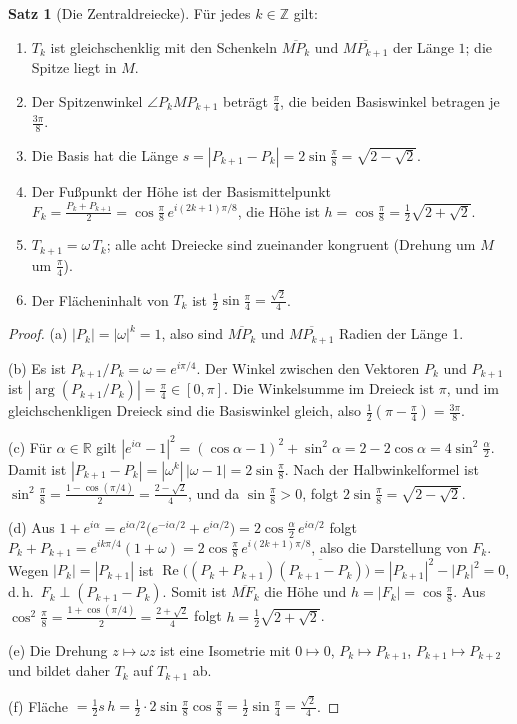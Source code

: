 \documentclass[a4paper,12pt,twoside]{report}
\theoremstyle{definition}
\newtheorem{satz}{Satz}
\begin{document}
\begin{satz}[Die Zentraldreiecke]\label{ok:satz:dreieck}
Für jedes $k\in\mathbb{Z}$ gilt:
\begin{enumerate}[label=(\alph*)]
\item $T_k$ ist gleichschenklig mit den Schenkeln $\overline{MP_k}$ und $\overline{MP_{k+1}}$ der Länge $1$; die Spitze liegt in $M$.
\item Der Spitzenwinkel $\angle P_kMP_{k+1}$ beträgt $\frac\pi4$, die beiden Basiswinkel betragen je $\frac{3\pi}{8}$.
\item Die Basis hat die Länge $s=|P_{k+1}-P_k|=2\sin\frac\pi8=\sqrt{2-\sqrt2}$.
\item Der Fußpunkt der Höhe ist der Basismittelpunkt $F_k=\frac{P_k+P_{k+1}}2=\cos\frac\pi8\,e^{i(2k+1)\pi/8}$, die Höhe ist $h=\cos\frac\pi8=\frac12\sqrt{2+\sqrt2}$.
\item $T_{k+1}=\omega\,T_k$; alle acht Dreiecke sind zueinander kongruent (Drehung um $M$ um $\frac\pi4$).
\item Der Flächeninhalt von $T_k$ ist $\frac12\sin\frac\pi4=\frac{\sqrt2}{4}$.
\end{enumerate}
\end{satz}

\begin{proof}
(a) $|P_k|=|\omega|^k=1$, also sind $\overline{MP_k}$ und $\overline{MP_{k+1}}$ Radien der Länge 1.

(b) Es ist $P_{k+1}/P_k=\omega=e^{i\pi/4}$. Der Winkel zwischen den Vektoren $P_k$ und $P_{k+1}$ ist $|\arg(P_{k+1}/P_k)|=\frac\pi4\in[0,\pi]$. Die Winkelsumme im Dreieck ist $\pi$, und im gleichschenkligen Dreieck sind die Basiswinkel gleich, also $\frac12(\pi-\frac\pi4)=\frac{3\pi}8$.

(c) Für $\alpha\in\mathbb{R}$ gilt $|e^{i\alpha}-1|^2=(\cos\alpha-1)^2+\sin^2\alpha=2-2\cos\alpha=4\sin^2\frac\alpha2$. Damit ist $|P_{k+1}-P_k|=|\omega^k|\,|\omega-1|=2\sin\frac\pi8$. Nach der Halbwinkelformel ist $\sin^2\frac\pi8=\frac{1-\cos(\pi/4)}2=\frac{2-\sqrt2}4$, und da $\sin\frac\pi8>0$, folgt $2\sin\frac\pi8=\sqrt{2-\sqrt2}$.

(d) Aus $1+e^{i\alpha}=e^{i\alpha/2}\bigl(e^{-i\alpha/2}+e^{i\alpha/2}\bigr)=2\cos\frac\alpha2\,e^{i\alpha/2}$ folgt $P_k+P_{k+1}=e^{ik\pi/4}(1+\omega)=2\cos\frac\pi8\,e^{i(2k+1)\pi/8}$, also die Darstellung von $F_k$. Wegen $|P_k|=|P_{k+1}|$ ist $\operatorname{Re}\bigl((P_k+P_{k+1})\overline{(P_{k+1}-P_k)}\bigr)=|P_{k+1}|^2-|P_k|^2=0$, d.\,h.\ $F_k\perp(P_{k+1}-P_k)$. Somit ist $\overline{MF_k}$ die Höhe und $h=|F_k|=\cos\frac\pi8$. Aus $\cos^2\frac\pi8=\frac{1+\cos(\pi/4)}2=\frac{2+\sqrt2}4$ folgt $h=\frac12\sqrt{2+\sqrt2}$.

(e) Die Drehung $z\mapsto\omega z$ ist eine Isometrie mit $0\mapsto0$, $P_k\mapsto P_{k+1}$, $P_{k+1}\mapsto P_{k+2}$ und bildet daher $T_k$ auf $T_{k+1}$ ab.

(f) Fläche $=\frac12 s\,h=\frac12\cdot2\sin\frac\pi8\cos\frac\pi8=\frac12\sin\frac\pi4=\frac{\sqrt2}4$.
\end{proof}
\end{document}
